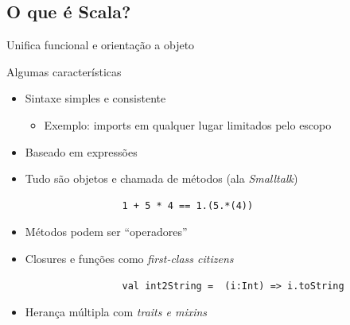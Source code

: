 \documentclass{beamer}
\begin{document}
\subsection{O que é Scala?}

\begin{frame}{Unifica funcional e orientação a objeto} 
\end{frame}

\begin{frame}[fragile]{Algumas características} 
    \begin{itemize} %
        \item Sintaxe simples e consistente 
        \begin{itemize}
              \item Exemplo: imports em qualquer lugar limitados pelo escopo 
        \end{itemize}
        \item Baseado em expressões
        \item Tudo são objetos e chamada de métodos (ala \emph{Smalltalk})
             \begin{lstlisting}
                 1 + 5 * 4 == 1.(5.*(4))
             \end{lstlisting}
        \item Métodos podem ser ``operadores''
        \item Closures e funções como \emph{first-class citizens}
             \begin{lstlisting}
                 val int2String =  (i:Int) => i.toString
             \end{lstlisting}
         \item Herança múltipla com \emph{traits e mixins}
    \end{itemize}
\end{frame}
\end{document}
